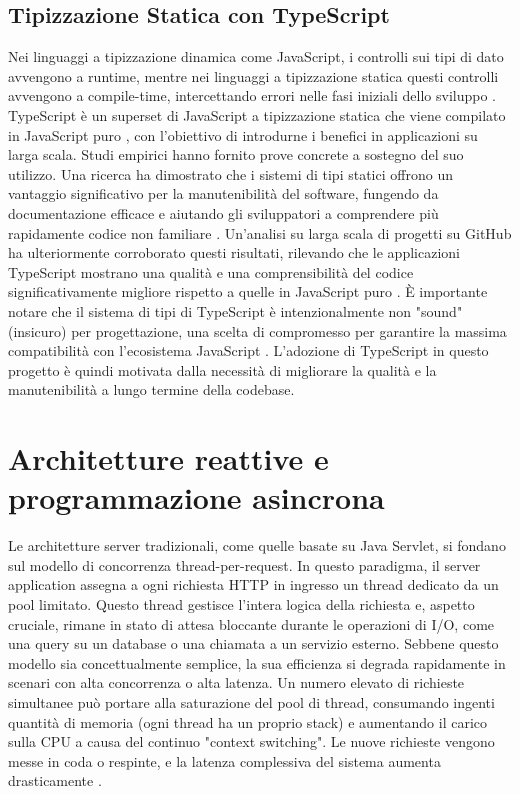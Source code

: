 \documentclass[12pt,a4paper,openright,twoside]{book}
\begin{document}
\subsection{Tipizzazione Statica con TypeScript}
Nei linguaggi a tipizzazione dinamica come JavaScript, i controlli sui tipi di dato avvengono a runtime, mentre nei linguaggi a tipizzazione statica questi controlli avvengono a compile-time, intercettando errori nelle fasi iniziali dello sviluppo \cite{mayerTyping}. TypeScript è un superset di JavaScript a tipizzazione statica che viene compilato in JavaScript puro \cite{bierman2014understanding}, con l'obiettivo di introdurne i benefici in applicazioni su larga scala. Studi empirici hanno fornito prove concrete a sostegno del suo utilizzo. Una ricerca ha dimostrato che i sistemi di tipi statici offrono un vantaggio significativo per la manutenibilità del software, fungendo da documentazione efficace e aiutando gli sviluppatori a comprendere più rapidamente codice non familiare \cite{hanenberg2014empirical}. Un'analisi su larga scala di progetti su GitHub ha ulteriormente corroborato questi risultati, rilevando che le applicazioni TypeScript mostrano una qualità e una comprensibilità del codice significativamente migliore rispetto a quelle in JavaScript puro \cite{Bogner_2022}. È importante notare che il sistema di tipi di TypeScript è intenzionalmente non "sound" (insicuro) per progettazione, una scelta di compromesso per garantire la massima compatibilità con l'ecosistema JavaScript \cite{bierman2014understanding}. L'adozione di TypeScript in questo progetto è quindi motivata dalla necessità di migliorare la qualità e la manutenibilità a lungo termine della codebase.

\section{Architetture reattive e programmazione asincrona}

Le architetture server tradizionali, come quelle basate su Java Servlet, si fondano sul modello di concorrenza thread-per-request. In questo paradigma, il server application assegna a ogni richiesta HTTP in ingresso un thread dedicato da un pool limitato. Questo thread gestisce l'intera logica della richiesta e, aspetto cruciale, rimane in stato di attesa bloccante durante le operazioni di I/O, come una query su un database o una chiamata a un servizio esterno. Sebbene questo modello sia concettualmente semplice, la sua efficienza si degrada rapidamente in scenari con alta concorrenza o alta latenza. Un numero elevato di richieste simultanee può portare alla saturazione del pool di thread, consumando ingenti quantità di memoria (ogni thread ha un proprio stack) e aumentando il carico sulla CPU a causa del continuo "context switching". Le nuove richieste vengono messe in coda o respinte, e la latenza complessiva del sistema aumenta drasticamente \cite{vrincean2021optimizing}.
\end{document}
